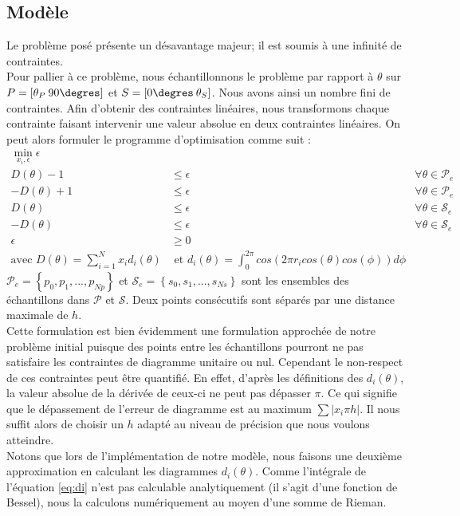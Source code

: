 \subsection{Modèle}
Le problème posé présente un désavantage majeur; il est soumis à une infinité de contraintes.\\
Pour pallier à ce problème, nous échantillonnons le problème par rapport à $\theta$ sur $P = [\theta_P\: 90\degres  ]$ et $S = [0\degres \:\theta_S]$. Nous avons ainsi un nombre fini de contraintes. Afin d'obtenir des contraintes linéaires, nous transformons chaque contrainte faisant intervenir une valeur absolue en deux contraintes linéaires. On peut alors formuler le programme d'optimisation comme suit :
\begin{align}
\min_{x_i,\epsilon} \epsilon & \\
 D(\theta)-1 &\leq \epsilon & \forall \theta\in \mathcal{P}_e \\
 -D(\theta)+1&\leq \epsilon & \forall \theta\in \mathcal{P}_e\\
 D(\theta) &\leq \epsilon & \forall \theta\in \mathcal{S}_e\\
 -D(\theta) &\leq \epsilon &\forall \theta\in \mathcal{S}_e\\
 \epsilon &\geq 0\\
\text{avec } D(\theta) = \sum_{i=1}^N x_i d_i(\theta) & \text{ et } d_i(\theta) = \int_0^{2 \pi} cos(2 \pi r_i cos(\theta)cos(\phi)) d\phi \label{eq:di} &
\end{align}
$\mathcal{P}_e = \left\lbrace p_0,p_1,...,p_{Np}\right\rbrace$ et $\mathcal{S}_e= \left\lbrace s_0,s_1,...,s_{Ns}\right\rbrace$ sont les ensembles des échantillons dans $\mathcal{P}$ et $\mathcal{S}$. Deux points consécutifs sont séparés par une distance maximale de $h$.\\
Cette formulation est bien évidemment une formulation approchée de notre problème initial puisque des points entre les échantillons pourront ne pas satisfaire les contraintes de diagramme unitaire ou nul. Cependant le non-respect de ces contraintes peut être quantifié. 
En effet, d'après les définitions des $d_i(\theta)$, la valeur absolue de la dérivée de ceux-ci ne peut pas dépasser $\pi$. Ce qui signifie que le dépassement de l'erreur de diagramme est au maximum $\sum |x_i\pi h|$. Il nous suffit alors de choisir un $h$ adapté au niveau de précision que nous voulons atteindre. 
\\
Notons que lors de l'implémentation de notre modèle, nous faisons une deuxième approximation en calculant les diagrammes $d_i(\theta)$. Comme l'intégrale de l'équation \eqref{eq:di} n'est pas calculable analytiquement (il s'agit d'une fonction de Bessel), nous la calculons numériquement au moyen d'une somme de Rieman.\\

